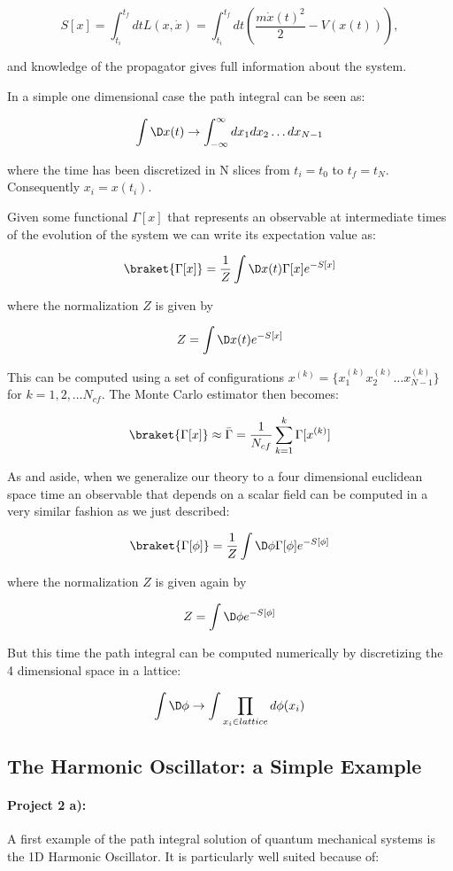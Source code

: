 \documentclass[%
oneside,                 %
final,                   %
10pt]{article}
\begin{document}
\[
	S[x] = \int_{t_i}^{t_f} dt L(x,\dot{x}) =  \int_{t_i}^{t_f} dt \left( \frac{m\dot{x}(t)^2}{2} - V(x(t))\right),
\]

and  knowledge of the propagator gives full information about the system.

In a simple one dimensional case the path integral can be seen as:

\[
	 \int \D x(t) \rightarrow \int_{-\infty}^{\infty} dx_1dx_2\dots dx_{N-1}
\]

where the time has been discretized in N slices from $t_i = t_0$ to $t_f = t_N$. Consequently $x_i = x(t_i)$.  

Given some functional $\Gamma[x]$ that represents an observable at intermediate times of the evolution of the system we can write its expectation value as:

\[
	\braket{\Gamma[x]} = \frac{1}{Z} \int \D x(t) \Gamma[x] e^{-S[x]}
\]

where the normalization $Z$ is given by 

\[
	Z = \int \D x(t) e^{-S[x]}
\]

This can be computed using a set of configurations $x^{(k)} = \{x^{(k)}_1x^{(k)}_2\dots x^{(k)}_{N-1} \}$ for $k = 1,2,\dots N_{cf}$. The Monte Carlo estimator then becomes:

\[
	\braket{\Gamma[x]} \approx \bar{\Gamma} = \frac{1}{N_{cf}} \sum_{k = 1}^k \Gamma[x^{(k)}]
\]

As and aside, when we generalize our theory to a four dimensional
euclidean space time an observable that depends on a scalar field can
be computed in a very similar fashion as we just described:

\[
	\braket{\Gamma[\phi]} = \frac{1}{Z} \int \D \phi \Gamma[\phi] e^{-S[\phi]}
\]

where the normalization $Z$ is given again by 

\[
	Z = \int \D \phi e^{-S[\phi]}
\]

But this time the path integral can be computed numerically by discretizing the 4 dimensional space in a lattice:

\[
	 \int \D \phi \rightarrow \int \prod_{x_i \in lattice} d\phi(x_i)
\] 

\subsection*{The Harmonic Oscillator: a Simple Example}

\paragraph{Project 2 a):}
A first example of the path integral solution of quantum mechanical systems is  the 1D Harmonic Oscillator. It is particularly well suited because of:
\end{document}
